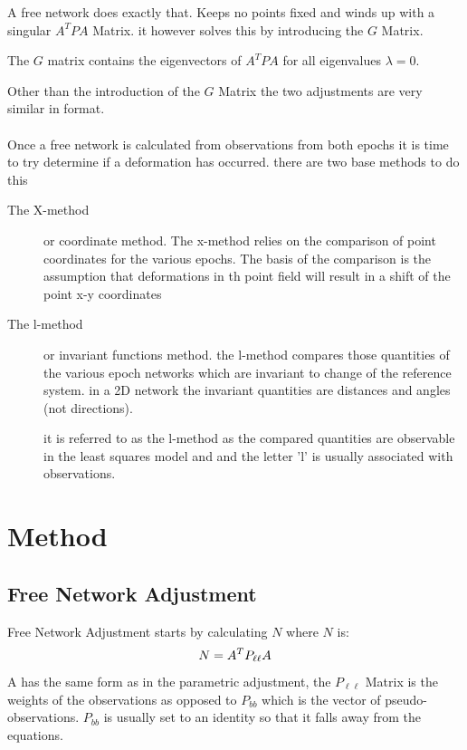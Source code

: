 \documentclass[12pt,a4paper]{article}
\begin{document}
	A free network does exactly that. Keeps no points fixed and winds up with a singular $A^TPA$ Matrix. it however solves this by introducing the $G$ Matrix.
	
	The $G$ matrix contains the eigenvectors of $A^TPA$ for all eigenvalues $\lambda = 0$.
	
	Other than the introduction of the $G$ Matrix the two adjustments are very similar in format.\\
	\\
	Once a free network is calculated from observations from both epochs it is time to try determine if a deformation has occurred. there are two base methods to do this
	\begin{description}
		\item [The X-method] or coordinate method. The x-method relies on the comparison of point coordinates for the various epochs. The basis of the comparison is the assumption that deformations in th point field will result in a shift of the point x-y coordinates
		
		\item [The l-method] or invariant functions method. the l-method compares those quantities of the various epoch networks which are invariant to change of the reference system. in a 2D network the invariant quantities are distances and angles (not directions).
		
		it is referred to as the l-method as the compared quantities are observable in the least squares model and and the letter 'l' is usually associated with observations.
	\end{description}

	\section{Method}
	
		\subsection{Free Network Adjustment}
	
			Free Network Adjustment starts by calculating $N$ where $N$ is:
			\begin{equation}
			\notag
			N = A^TP_{\ell\ell}A
			\end{equation}
			A has the same form as in the parametric adjustment, the $P_{\ell\ell}$ Matrix is the weights of the observations as opposed to $P_{bb}$ which is the vector of pseudo-observations. $P_{bb}$ is usually set to an identity so that it falls away from the equations.
			
\end{document}
